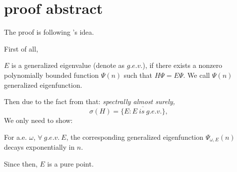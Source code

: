 \section{proof abstract}
The proof is following \cite{jitomirskaya1999metal}
's idea.

First of all,
\begin{definition}[$g.e.v.$]
    $E$ is a generalized eigenvalue (denote as $g.e.v.$), if there exists a nonzero polynomially bounded function $\Psi(n)$ such that $H\Psi=E\Psi$. We call $\Psi(n)$ generalized eigenfunction.
\end{definition}
Then due to the fact from \cite{simon1982schrodinger} that:
\textit{spectrally almost surely,
\[
\sigma(H)=\overline{\{E:E~is~g.e.v.\}},
\]}
We only need to show:
\begin{thm}
  For a.e. $\omega$, $\forall~g.e.v.~E$, the corresponding generalized eigenfunction $\Psi_{\omega,E}(n)$ decays exponentially in $n$.
\end{thm}

Since then, $E$ is a pure point.
